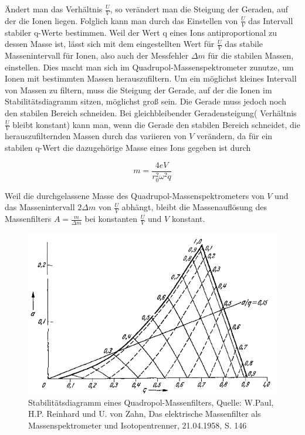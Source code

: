 \documentclass[10pt,a4paper]{article}
\begin{document}
Ändert man das Verhältnis $\frac{U}{V}$, so verändert man die Steigung der Geraden, auf der die Ionen liegen. Folglich kann man durch das Einstellen von $\frac{U}{V}$ das Intervall stabiler q-Werte bestimmen. Weil der Wert q eines Ions antiproportional zu dessen Masse ist, lässt sich mit dem eingestellten Wert für $\frac{U}{V}$ das stabile Massenintervall für Ionen, also auch der Messfehler $\Delta m$ für die stabilen Massen, einstellen. Dies macht man sich im Quadrupol-Massenspektrometer zunutze, um Ionen mit bestimmten Massen herauszufiltern. Um ein möglichst kleines Intervall von Massen zu filtern, muss die Steigung der Gerade, auf der die Ionen im Stabilitätsdiagramm sitzen, möglichst groß sein. Die Gerade muss jedoch noch den stabilen Bereich schneiden. Bei gleichbleibender Geradensteigung( Verhältnis $\frac{U}{V}$ bleibt konstant) kann man, wenn die Gerade den stabilen Bereich schneidet, die herauszufilternden Massen durch das variieren von $V$ verändern, da für ein stabilen q-Wert die dazugehörige Masse eines Ions gegeben ist durch

\begin{equation}
	m = \frac{4eV}{r_0^2\omega^2q}
\end{equation}

Weil die durchgelassene Masse des Quadrupol-Massenspektrometers von $V$ und das Massenintervall $2 \Delta m$ von $\frac{U}{V}$ abhängt, bleibt die Massenauflösung des Massenfilters $A = \frac{m}{\Delta m}$ bei konstanten $\frac{U}{V}$ und $V$ konstant.


\begin{figure}[h]
	\centering
	\includegraphics[scale = 0.8]{stabilitatsdiagramm.png}
	\caption{Stabilitätsdiagramm eines Quadropol-Massenfilters, Quelle: W.Paul, H.P. Reinhard und U. von Zahn, Das elektrische Massenfilter als Massenspektrometer und Isotopentrenner, 21.04.1958, S. 146}
	\label{stabilitatsdiagramm1}
\end{figure}
\end{document}

